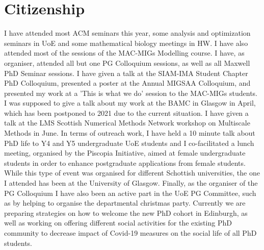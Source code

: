 \documentclass[11pt, a4paper]{article}
\theoremstyle{definition}
\begin{document}
\section{Citizenship}
I have attended most ACM seminars this year, some analysis and optimization seminars in UoE and some mathematical biology meetings in HW. I have also attended most of the sessions of the MAC-MIGs Modelling course. I have, as organiser, attended all but one PG Colloquium sessions, as well as all Maxwell PhD Seminar sessions.
I have given a talk at the SIAM-IMA Student Chapter PhD Colloquium, presented a poster at the Annual MIGSAA Colloquium, and presented my work at a 'This is what we do' session to the MAC-MIGs students. I was supposed to give a talk about my work at the BAMC in Glasgow in April, which has been postponed to 2021 due to the current situation. I have given a talk at the LMS Scottish Numerical Methods Network workshop on Multiscale Methods in June. In terms of outreach work, I have held a 10 minute talk about PhD life to Y4 and Y5 undergraduate UoE students and I co-facilitated a lunch meeting, organised by the Piscopia Initiative, aimed at female undergraduate students in order to enhance postgraduate applications from female students. While this type of event was organised for different Schottish universities, the one I attended has been at the University of Glasgow.
Finally, as the organiser of the PG Colloquium I have also been an active part in the UoE PG Committee, such as by helping to organise the departmental christmas party. Currently we are preparing strategies on how to welcome the new PhD cohort in Edinburgh, as well as working on offering different social activities for the existing PhD community to decrease impact of Covid-19 measures on the social life of all PhD students.
\end{document}

